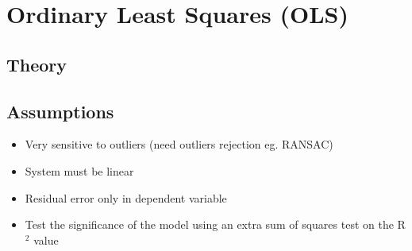 \section{Ordinary Least Squares (OLS)}
\subsection{Theory} \todo{}

\subsection{Assumptions} 
\begin{itemize}
	\item Very sensitive to outliers (need outliers rejection eg. RANSAC)
	\item System must be linear
	\item Residual error only in dependent variable
	\item Test the significance of the model using an extra sum of squares test on the R$^2$ value
\end{itemize}
